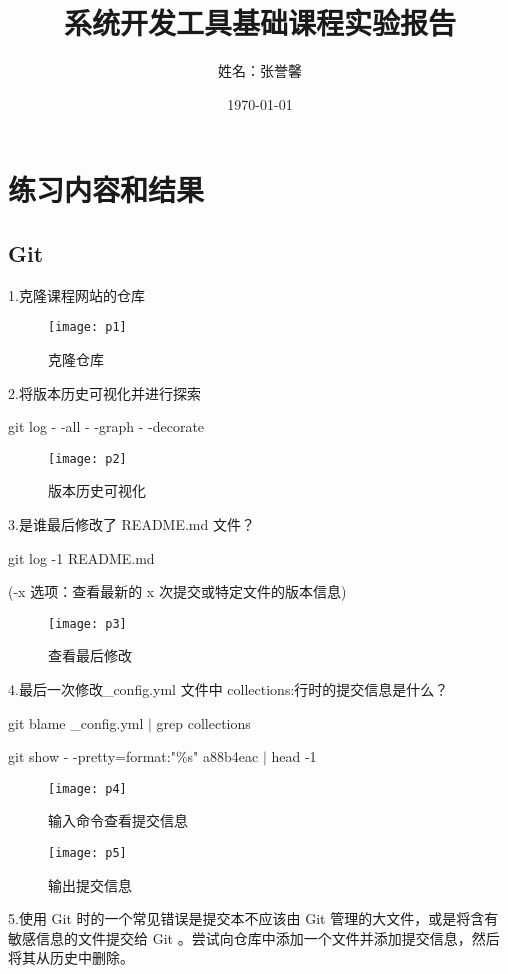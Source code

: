 \documentclass[a4paper ,12pt]{article}
\begin{document}
  \title{系统开发工具基础课程实验报告}
  \author{姓名：张誉馨}
  \date{\today}
  \maketitle
  
  \tableofcontents
  \newpage
  
  \section{练习内容和结果}
  
  \subsection{Git}
  1.克隆课程网站的仓库
  \begin{figure}[h]
  	\centering
  	\texttt{[image: p1]}
  	\caption{克隆仓库}
  \end{figure}
  
  2.将版本历史可视化并进行探索
  
  git log - -all - -graph - -decorate
  \begin{figure}[h]
  	\centering
  	\texttt{[image: p2]}
  	\caption{版本历史可视化}
  \end{figure}
  
  3.是谁最后修改了 README.md 文件？
  
  git log -1 README.md
  
  (-x 选项：查看最新的 x 次提交或特定文件的版本信息)
  \begin{figure}[h]
  	\centering
  	\texttt{[image: p3]}
  	\caption{查看最后修改}
  \end{figure}
  
  4.最后一次修改\_config.yml 文件中 collections:行时的提交信息是什么？
  
  git blame \_config.yml $|$ grep collections
  
  git show - -pretty=format:"\%s" a88b4eac $|$ head -1
  \begin{figure}[h]
  	\centering
  	\texttt{[image: p4]}
  	\caption{输入命令查看提交信息}
  \end{figure}
  \begin{figure}[h]
  	\centering
  	\texttt{[image: p5]}
  	\caption{输出提交信息}
  \end{figure}
  
  5.使用 Git 时的一个常见错误是提交本不应该由 Git 管理的大文件，或是将含有敏感信息的文件提交给 Git 。尝试向仓库中添加一个文件并添加提交信息，然后将其从历史中删除。
  
\end{document}
